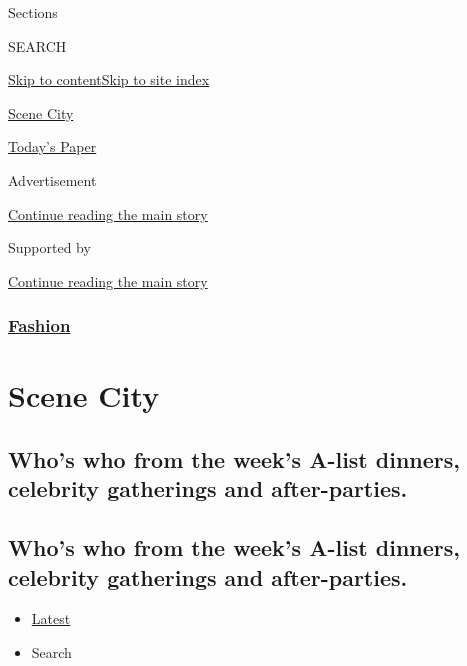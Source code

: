 Sections

SEARCH

\protect\hyperlink{site-content}{Skip to
content}\protect\hyperlink{site-index}{Skip to site index}

\href{https://www.nytimes.com/column/scene-city}{Scene City}

\href{https://myaccount.nytimes.com/auth/login?response_type=cookie\&client_id=vi}{}

\href{https://www.nytimes.com/section/todayspaper}{Today's Paper}

Advertisement

\protect\hyperlink{after-top}{Continue reading the main story}

Supported by

\protect\hyperlink{after-sponsor}{Continue reading the main story}

\hypertarget{fashion}{%
\subsubsection{\texorpdfstring{\href{/section/fashion}{Fashion}}{Fashion}}\label{fashion}}

\hypertarget{scene-city}{%
\section{Scene City}\label{scene-city}}

\hypertarget{whos-who-from-the-weeks-a-list-dinners-celebrity-gatherings-and-after-parties}{%
\subsection{Who's who from the week's A-list dinners, celebrity
gatherings and
after-parties.}\label{whos-who-from-the-weeks-a-list-dinners-celebrity-gatherings-and-after-parties}}

\hypertarget{whos-who-from-the-weeks-a-list-dinners-celebrity-gatherings-and-after-parties-1}{%
\subsection{Who's who from the week's A-list dinners, celebrity
gatherings and
after-parties.}\label{whos-who-from-the-weeks-a-list-dinners-celebrity-gatherings-and-after-parties-1}}

\begin{itemize}
\tightlist
\item
  \protect\hyperlink{stream-panel}{Latest}
\item
  Search
\end{itemize}

